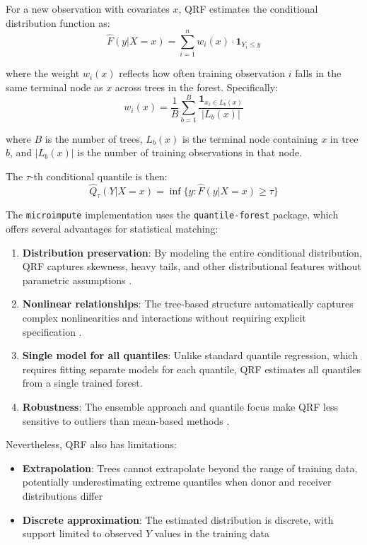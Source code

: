 For a new observation with covariates $x$, QRF estimates the conditional distribution function as:
\begin{equation}
    \hat{F}(y|X=x) = \sum_{i=1}^{n} w_i(x) \cdot \mathbf{1}_{Y_i \leq y}
\end{equation}

where the weight $w_i(x)$ reflects how often training observation $i$ falls in the same terminal node as $x$ across trees in the forest. Specifically:
\begin{equation}
    w_i(x) = \frac{1}{B} \sum_{b=1}^{B} \frac{\mathbf{1}_{x_i \in L_b(x)}}{|L_b(x)|}
\end{equation}

where $B$ is the number of trees, $L_b(x)$ is the terminal node containing $x$ in tree $b$, and $|L_b(x)|$ is the number of training observations in that node.

The $\tau$-th conditional quantile is then:
\begin{equation}
    \hat{Q}_\tau(Y|X=x) = \inf\{y : \hat{F}(y|X=x) \geq \tau\}
\end{equation}

The \texttt{microimpute} implementation uses the \texttt{quantile-forest} package, which offers several advantages for statistical matching:

\begin{enumerate}
    \item \textbf{Distribution preservation}: By modeling the entire conditional distribution, QRF captures skewness, heavy tails, and other distributional features without parametric assumptions \citep{meinshausen2006quantile}.
    \item \textbf{Nonlinear relationships}: The tree-based structure automatically captures complex nonlinearities and interactions without requiring explicit specification \citep{breiman2001random}.
    \item \textbf{Single model for all quantiles}: Unlike standard quantile regression, which requires fitting separate models for each quantile, QRF estimates all quantiles from a single trained forest.
    \item \textbf{Robustness}: The ensemble approach and quantile focus make QRF less sensitive to outliers than mean-based methods \citep{tang2017random}.
\end{enumerate}

Nevertheless, QRF also has limitations:
\begin{itemize}
    \item \textbf{Extrapolation}: Trees cannot extrapolate beyond the range of training data, potentially underestimating extreme quantiles when donor and receiver distributions differ
    \item \textbf{Discrete approximation}: The estimated distribution is discrete, with support limited to observed $Y$ values in the training data
\end{itemize}

